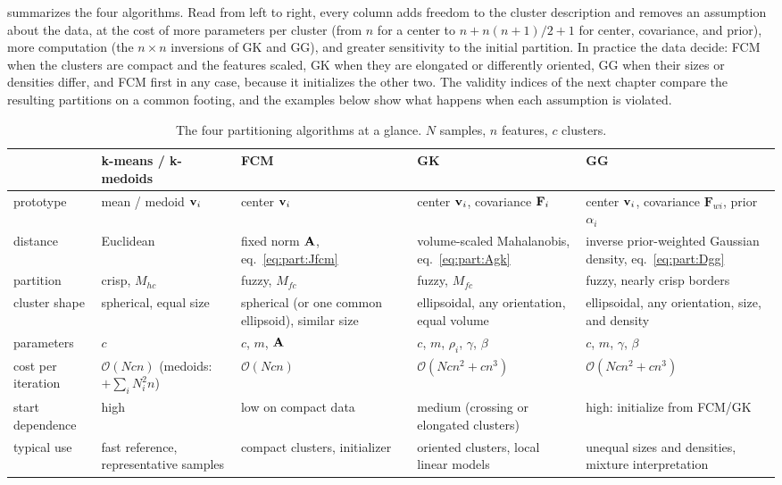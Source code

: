  summarizes the four algorithms. Read from left to right, every column adds freedom to the cluster description and removes an assumption about the data, at the cost of more parameters per cluster (from $n$ for a center to $n+n(n+1)/2+1$ for center, covariance, and prior), more computation (the $n\times n$ inversions of GK and GG), and greater sensitivity to the initial partition. In practice the data decide: FCM when the clusters are compact and the features scaled, GK when they are elongated or differently oriented, GG when their sizes or densities differ, and FCM first in any case, because it initializes the other two. The validity indices of the next chapter compare the resulting partitions on a common footing, and the examples below show what happens when each assumption is violated.

\begin{table}[htbp]\centering\small
\caption[The four partitioning algorithms at a glance.]{The four partitioning algorithms at a glance. $N$ samples, $n$ features, $c$ clusters.}
\label{tab:part:comparison}
\begin{tabularx}{\textwidth}{@{}l >{\raggedright\arraybackslash}X >{\raggedright\arraybackslash}X >{\raggedright\arraybackslash}X >{\raggedright\arraybackslash}X@{}}\toprule
 & k-means / k-medoids & FCM & GK & GG \\\midrule
prototype & mean / medoid $\mathbf{v}_i$ & center $\mathbf{v}_i$ & center $\mathbf{v}_i$, covariance $\mathbf{F}_i$ & center $\mathbf{v}_i$, covariance $\mathbf{F}_{wi}$, prior $\alpha_i$ \\
distance & Euclidean & fixed norm $\mathbf{A}$, eq.~\eqref{eq:part:Jfcm} & volume-scaled Mahalanobis, eq.~\eqref{eq:part:Agk} & inverse prior-weighted Gaussian density, eq.~\eqref{eq:part:Dgg} \\
partition & crisp, $M_{hc}$ & fuzzy, $M_{fc}$ & fuzzy, $M_{fc}$ & fuzzy, nearly crisp borders \\
cluster shape & spherical, equal size & spherical (or one common ellipsoid), similar size & ellipsoidal, any orientation, equal volume & ellipsoidal, any orientation, size, and density \\
parameters & $c$ & $c$, $m$, $\mathbf{A}$ & $c$, $m$, $\rho_i$, $\gamma$, $\beta$ & $c$, $m$, $\gamma$, $\beta$ \\
cost per iteration & $\mathcal{O}(Ncn)$ (medoids: $+\sum_iN_i^2n$) & $\mathcal{O}(Ncn)$ & $\mathcal{O}(Ncn^2+cn^3)$ & $\mathcal{O}(Ncn^2+cn^3)$ \\
start dependence & high & low on compact data & medium (crossing or elongated clusters) & high: initialize from FCM/GK \\
typical use & fast reference, representative samples & compact clusters, initializer & oriented clusters, local linear models & unequal sizes and densities, mixture interpretation \\\bottomrule
\end{tabularx}
\end{table}

